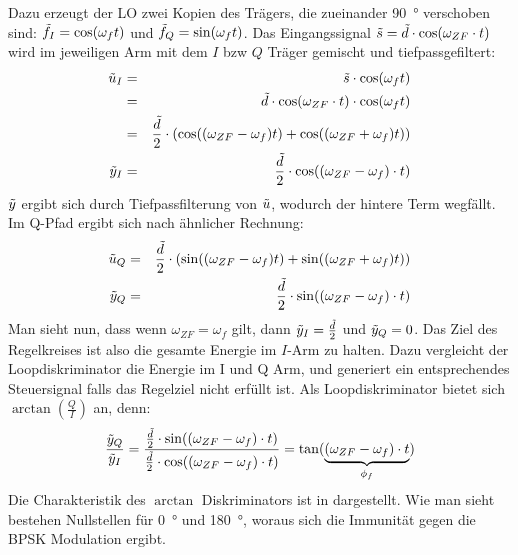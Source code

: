Dazu erzeugt der LO zwei Kopien des Trägers, die zueinander \SI{90}{\degree} verschoben sind: $\tilde{f}_I=\cos(\omega_{f} t)$ und  $\tilde{f}_Q=\sin(\omega_{f} t)$. Das Eingangssignal $\tilde{s}=\tilde{d} \cdot \cos(\omega_{ZF} \cdot t)$ wird im jeweiligen Arm mit dem $I$ bzw $Q$ Träger gemischt und tiefpassgefiltert:
\begin{eqnarray}
	\tilde{u}_I &=& \tilde{s} \cdot \cos(\omega_{f} t)\\
		    &=& \tilde{d} \cdot \cos(\omega_{ZF} \cdot t) \cdot \cos(\omega_{f} t)\\
            &=& \frac{\tilde{d}}{2} \cdot (\cos((\omega_{ZF}-\omega_{f}) t)+ \cos((\omega_{ZF}+\omega_{f}) t)) \\
    \tilde{y}_I &=& \frac{\tilde{d}}{2} \cdot \cos((\omega_{ZF}-\omega_{f})\cdot t)
\end{eqnarray}
$\tilde{y}$  ergibt sich durch Tiefpassfilterung von $\tilde{u}$, wodurch der hintere Term wegfällt. Im Q-Pfad ergibt sich nach ähnlicher Rechnung:
\begin{eqnarray}
\tilde{u}_Q &=& \frac{\tilde{d}}{2} \cdot (\sin((\omega_{ZF}-\omega_{f}) t)+ \sin((\omega_{ZF}+\omega_{f}) t))\\
\tilde{y}_Q &=& \frac{\tilde{d}}{2} \cdot \sin((\omega_{ZF}-\omega_{f})\cdot t)
\end{eqnarray}
Man sieht nun, dass wenn $\omega_{ZF}=\omega_{f}$ gilt, dann $\tilde{y}_I = \frac{\tilde{d}}{2}$  und $\tilde{y}_Q =0$. Das Ziel des Regelkreises ist also die gesamte Energie im $I$-Arm zu halten. 
Dazu vergleicht der Loopdiskriminator die Energie im I und Q Arm, und generiert ein entsprechendes Steuersignal falls das Regelziel nicht erfüllt ist. Als Loopdiskriminator bietet sich $\arctan\left(\frac{Q}{I}\right)$ an, denn: 
\begin{equation}
	\frac{\tilde{y}_Q}{\tilde{y}_I} = \frac{ \frac{\tilde{d}}{2} \cdot \sin((\omega_{ZF}-\omega_{f})\cdot t)}{\frac{\tilde{d}}{2} \cdot \cos((\omega_{ZF}-\omega_{f})\cdot t)} = \tan({\underbrace{(\omega_{ZF}-\omega_{f})\cdot t}_{\phi_f}})
\end{equation}
Die Charakteristik des $\arctan$ Diskriminators ist in  dargestellt. Wie man sieht bestehen Nullstellen für \SI{0}{\degree} und \SI{180}{\degree}, woraus sich die Immunität gegen die BPSK Modulation ergibt.


